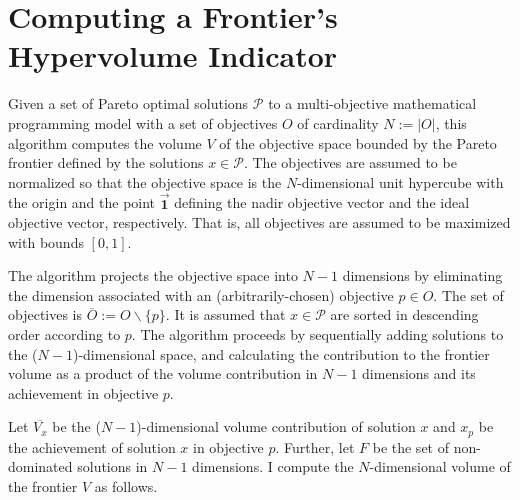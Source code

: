  
\chapter{Computing a Frontier's Hypervolume Indicator}
\label{chap:appAHypervolumeAlgo}

Given a set of Pareto optimal solutions $\mathcal{P}$ to a multi-objective mathematical programming model with a set of objectives $O$ of cardinality $N := |O|$, this algorithm computes the volume $V$ of the objective space bounded by the Pareto frontier defined by the solutions $x \in \mathcal{P}$. The objectives are assumed to be normalized so that the objective space is the $N$-dimensional unit hypercube with the origin and the point $\vec{\mathbf{1}}$ defining the nadir objective vector and the ideal objective vector, respectively. That is, all objectives are assumed to be maximized with bounds $[0,1]$.

The algorithm projects the objective space into $N-1$ dimensions by eliminating the dimension associated with an (arbitrarily-chosen) objective $p \in O$. The set of objectives is $\overbar{O} := O \backslash \{p\}$. It is assumed that $x \in \mathcal{P}$ are sorted in descending order according to $p$. The algorithm proceeds by sequentially adding solutions to the ($N-1$)-dimensional space, and calculating the contribution to the frontier volume as a product of the volume contribution in $N-1$ dimensions and its achievement in objective $p$.

Let $\overbar{V_x}$ be the ($N-1$)-dimensional volume contribution of solution $x$ and
$x_p$ be the achievement of solution $x$ in objective $p$. Further, let
$F$ be the set of non-dominated solutions in $N-1$ dimensions.
I compute the $N$-dimensional volume of the frontier $V$ as follows.

